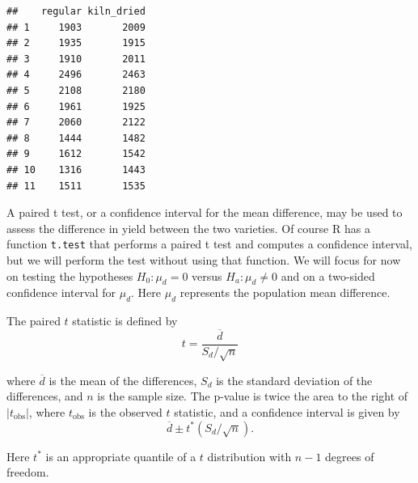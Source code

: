 \documentclass[
]{krantz}
\newenvironment{Shaded}{\begin{snugshade}}{\end{snugshade}}
\newcommand{\KeywordTok}[1]{\textcolor[rgb]{0.13,0.29,0.53}{\textbf{#1}}}
\newcommand{\NormalTok}[1]{#1}
\newcommand{\OperatorTok}[1]{\textcolor[rgb]{0.81,0.36,0.00}{\textbf{#1}}}
\newcommand{\StringTok}[1]{\textcolor[rgb]{0.31,0.60,0.02}{#1}}
\begin{document}
\begin{verbatim}
##    regular kiln_dried
## 1     1903       2009
## 2     1935       1915
## 3     1910       2011
## 4     2496       2463
## 5     2108       2180
## 6     1961       1925
## 7     2060       2122
## 8     1444       1482
## 9     1612       1542
## 10    1316       1443
## 11    1511       1535
\end{verbatim}

A paired t test, or a confidence interval for the mean difference, may be used to assess the difference in yield between the two varieties. Of course R has a function \texttt{t.test} that performs a paired t test and computes a confidence interval, but we will perform the test without using that function. We will focus for now on testing the hypotheses \(H_0\colon \mu_d = 0\) versus \(H_a\colon \mu_d \neq 0\) and on a two-sided confidence interval for \(\mu_d\). Here \(\mu_d\) represents the population mean difference.

The paired \(t\) statistic is defined by
\begin{equation}
t = \frac{\overline d}{S_d/\sqrt{n}}
\end{equation}

where \(\overline d\) is the mean of the differences, \(S_d\) is the standard deviation of the differences, and \(n\) is the sample size. The p-value is twice the area to the right of \(|t_{\text{obs}}|\), where \(t_{\text{obs}}\) is the observed \(t\) statistic, and a confidence interval is given by
\begin{equation}
\overline d \pm t^* (S_d/\sqrt{n}).
\end{equation}

Here \(t^*\) is an appropriate quantile of a \(t\) distribution with \(n-1\) degrees of freedom.

\begin{Shaded}
\end{Shaded}
\end{document}
